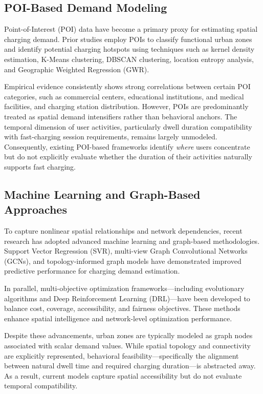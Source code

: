 \documentclass[conference]{IEEEtran}
\begin{document}
\subsection{POI-Based Demand Modeling}

Point-of-Interest (POI) data have become a primary proxy for estimating spatial charging demand. Prior studies employ POIs to classify functional urban zones and identify potential charging hotspots using techniques such as kernel density estimation, K-Means clustering, DBSCAN clustering, location entropy analysis, and Geographic Weighted Regression (GWR).

Empirical evidence consistently shows strong correlations between certain POI categories, such as commercial centers, educational institutions, and medical facilities, and charging station distribution. However, POIs are predominantly treated as spatial demand intensifiers rather than behavioral anchors. The temporal dimension of user activities, particularly dwell duration compatibility with fast-charging session requirements, remains largely unmodeled. Consequently, existing POI-based frameworks identify \emph{where} users concentrate but do not explicitly evaluate whether the duration of their activities naturally supports fast charging.

\subsection{Machine Learning and Graph-Based Approaches}

To capture nonlinear spatial relationships and network dependencies, recent research has adopted advanced machine learning and graph-based methodologies. Support Vector Regression (SVR), multi-view Graph Convolutional Networks (GCNs), and topology-informed graph models have demonstrated improved predictive performance for charging demand estimation.

In parallel, multi-objective optimization frameworks—including evolutionary algorithms and Deep Reinforcement Learning (DRL)—have been developed to balance cost, coverage, accessibility, and fairness objectives. These methods enhance spatial intelligence and network-level optimization performance.

Despite these advancements, urban zones are typically modeled as graph nodes associated with scalar demand values. While spatial topology and connectivity are explicitly represented, behavioral feasibility—specifically the alignment between natural dwell time and required charging duration—is abstracted away. As a result, current models capture spatial accessibility but do not evaluate temporal compatibility.
\end{document}
